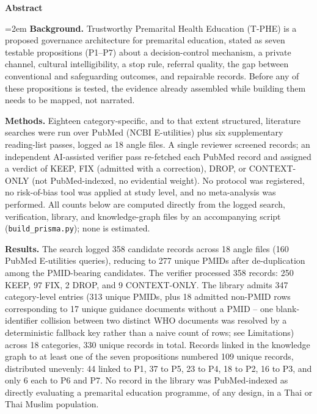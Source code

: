 \documentclass[11pt]{article}
\newcommand{\tphe}{T\mbox{-}PHE}
\begin{document}
\vspace{4mm}
\noindent\textbf{Abstract}\par\vspace{2pt}
\noindent\begin{minipage}{\textwidth}
\small\raggedright{}\emergencystretch=2em
\textbf{Background.} Trustworthy Premarital Health Education (\tphe) is a proposed governance
architecture for premarital education, stated as seven testable propositions (P1--P7) about a
decision-control mechanism, a private channel, cultural intelligibility, a stop rule, referral
quality, the gap between conventional and safeguarding outcomes, and repairable records. Before
any of these propositions is tested, the evidence already assembled while building them needs to
be mapped, not narrated.

\textbf{Methods.} Eighteen category-specific, and to that extent structured, literature searches
were run over PubMed (NCBI E-utilities) plus six supplementary reading-list passes, logged as
18 angle files. A single reviewer screened records; an independent AI-assisted verifier pass
re-fetched each PubMed record and assigned a verdict of KEEP, FIX (admitted with a correction),
DROP, or CONTEXT-ONLY (not PubMed-indexed, no evidential weight). No protocol was registered, no
risk-of-bias tool was applied at study level, and no meta-analysis was performed. All counts
below are computed directly from the logged search, verification, library, and knowledge-graph
files by an accompanying script (\texttt{build\-\_prisma.py}); none is estimated.

\textbf{Results.} The search logged 358 candidate records across 18 angle files (160 PubMed
E-utilities queries), reducing to 277 unique PMIDs after de-duplication among the
PMID-bearing candidates. The verifier processed 358 records: 250 KEEP, 97 FIX, 2 DROP, and 9
CONTEXT-ONLY. The library admits 347 category-level entries (313 unique PMIDs, plus 18 admitted
non-PMID rows corresponding to 17 unique guidance documents without a PMID -- one blank-identifier
collision between two distinct WHO documents was resolved by a deterministic fallback key rather
than a naive count of rows; see Limitations) across 18 categories, 330 unique records in total.
Records linked in the knowledge graph
to at least one of the seven propositions numbered 109 unique records, distributed unevenly:
44 linked to P1, 37 to P5, 23 to P4, 18 to P2, 16 to P3, and only 6 each to P6 and P7. No record
in the library was PubMed-indexed as directly evaluating a premarital education programme, of
any design, in a Thai or Thai Muslim population.


\end{minipage}
\end{document}
